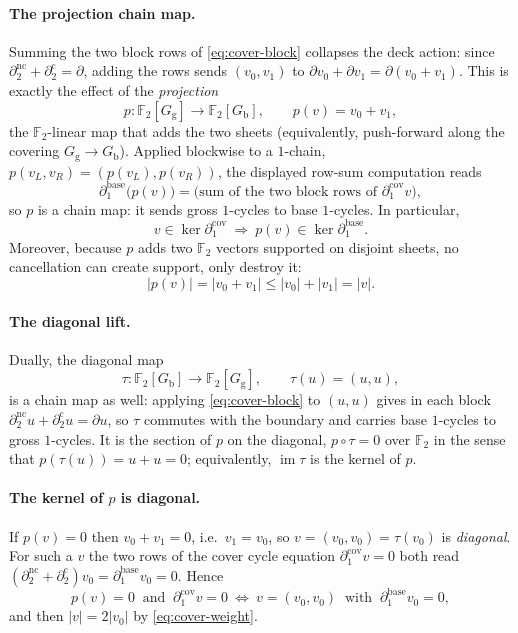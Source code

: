 \documentclass[11pt]{article}
\newcommand{\F}[1]{\mathbb{F}_{#1}}
\newcommand{\wt}[1]{\lvert #1\rvert}
\DeclareMathOperator{\img}{im}
\newcommand{\dcut}{\partial_2^{\mathrm{c}}}     %
\newcommand{\dncut}{\partial_2^{\mathrm{nc}}}   %
\theoremstyle{plain}
\theoremstyle{definition}
\theoremstyle{remark}
\begin{document}
\paragraph{The projection chain map.}
Summing the two block rows of \eqref{eq:cover-block} collapses the deck action: since
$\dncut+\dcut=\partial$, adding the rows sends $(v_0,v_1)$ to
$\partial v_0+\partial v_1=\partial(v_0+v_1)$. This is exactly the effect of the
\emph{projection}
\[
  p\colon \F2[G_{\mathrm g}]\to\F2[G_{\mathrm b}],\qquad p(v)=v_0+v_1,
\]
the $\F2$-linear map that adds the two sheets (equivalently, push-forward along the
covering $G_{\mathrm g}\to G_{\mathrm b}$). Applied blockwise to a $1$-chain,
$p(v_L,v_R)=(p(v_L),p(v_R))$, the displayed row-sum computation reads
\begin{equation}\label{eq:p-chainmap}
  \partial_1^{\mathrm{base}}\bigl(p(v)\bigr)
  =\text{(sum of the two block rows of }\partial_1^{\mathrm{cov}}v),
\end{equation}
so $p$ is a chain map: it sends gross $1$-cycles to base $1$-cycles. In particular,
\[
  v\in\ker\partial_1^{\mathrm{cov}}\ \Longrightarrow\ p(v)\in\ker\partial_1^{\mathrm{base}} .
\]
Moreover, because $p$ adds two $\F2$ vectors supported on disjoint sheets, no cancellation
can create support, only destroy it:
\begin{equation}\label{eq:p-weightdrop}
  \wt{p(v)}=\wt{v_0+v_1}\le\wt{v_0}+\wt{v_1}=\wt{v}.
\end{equation}

\paragraph{The diagonal lift.}
Dually, the diagonal map
\[
  \tau\colon\F2[G_{\mathrm b}]\to\F2[G_{\mathrm g}],\qquad \tau(u)=(u,u),
\]
is a chain map as well: applying \eqref{eq:cover-block} to $(u,u)$ gives in each block
$\dncut u+\dcut u=\partial u$, so $\tau$ commutes with the boundary and carries base
$1$-cycles to gross $1$-cycles. It is the section of $p$ on the diagonal,
$p\circ\tau=0$ over $\F2$ in the sense that $p(\tau(u))=u+u=0$; equivalently, $\img\tau$
is the kernel of $p$.

\paragraph{The kernel of \texorpdfstring{$p$}{p} is diagonal.}
If $p(v)=0$ then $v_0+v_1=0$, i.e.\ $v_1=v_0$, so $v=(v_0,v_0)=\tau(v_0)$ is
\emph{diagonal}. For such a $v$ the two rows of the cover cycle equation
$\partial_1^{\mathrm{cov}}v=0$ both read $(\dncut+\dcut)v_0=\partial_1^{\mathrm{base}}v_0=0$.
Hence
\begin{equation}\label{eq:diag-cycle}
  p(v)=0\ \text{ and }\ \partial_1^{\mathrm{cov}}v=0
  \ \Longleftrightarrow\ v=(v_0,v_0)\ \text{ with }\ \partial_1^{\mathrm{base}}v_0=0,
\end{equation}
and then $\wt{v}=2\wt{v_0}$ by \eqref{eq:cover-weight}.
\end{document}
